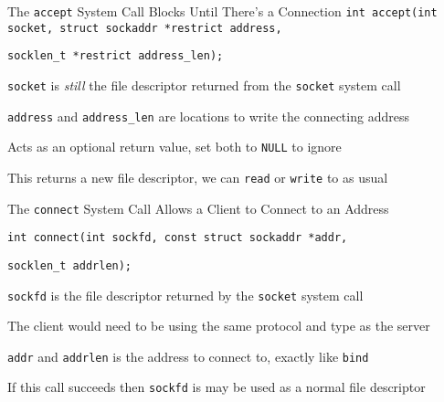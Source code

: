   \begin{frame}{The \texttt{accept} System Call Blocks Until There's a Connection}
    \lstinline|int accept(int socket, struct sockaddr *restrict address,|

    \hspace{5.4em} \lstinline|socklen_t *restrict address_len);|

    \vspace{2em}

    \texttt{socket} is \textit{still} the file descriptor returned from the
    \texttt{socket} system call

    \vspace{2em}

    \texttt{address} and \texttt{address\_len} are locations to write the
    connecting address

    \hspace{2em} Acts as an optional return value, set both to \texttt{NULL} to
                 ignore

    \vspace{2em}

    This returns a new file descriptor, we can \texttt{read} or \texttt{write}
    to as usual
  \end{frame}

  \begin{frame}{The \texttt{connect} System Call Allows a Client to Connect to
                an Address}

    \lstinline|int connect(int sockfd, const struct sockaddr *addr,|
                   
    \hspace{5.9em} \lstinline|socklen_t addrlen);|

    \vspace{2em}

    \texttt{sockfd} is the file descriptor returned by the \texttt{socket}
    system call

    \hspace{2em} The client would need to be using the same protocol and type
    as the server

    \vspace{2em}

    \texttt{addr} and \texttt{addrlen} is the address to connect to, exactly
    like \texttt{bind}

    \vspace{2em}

    If this call succeeds then \texttt{sockfd} is may be used as a normal
    file descriptor
  \end{frame}

